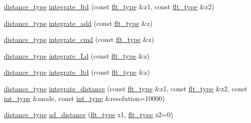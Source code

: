 \begin{DoxyCompactItemize}
\item 
\hyperlink{namespaceIceBRG_a45499647eb87e24c10ab32c628711cec}{distance\-\_\-type} \hyperlink{namespaceIceBRG_ad26acf5308cef1b32f3d1bbe50da3899}{integrate\-\_\-ltd} (const \hyperlink{lib_2IceBRG__main_2common_8h_ad0f130a56eeb944d9ef2692ee881ecc4}{flt\-\_\-type} \&z1, const \hyperlink{lib_2IceBRG__main_2common_8h_ad0f130a56eeb944d9ef2692ee881ecc4}{flt\-\_\-type} \&z2)
\item 
\hyperlink{namespaceIceBRG_a45499647eb87e24c10ab32c628711cec}{distance\-\_\-type} \hyperlink{namespaceIceBRG_a36a9d9b01c4b3decad051fd96a65f255}{integrate\-\_\-add} (const \hyperlink{lib_2IceBRG__main_2common_8h_ad0f130a56eeb944d9ef2692ee881ecc4}{flt\-\_\-type} \&z)
\item 
\hyperlink{namespaceIceBRG_a45499647eb87e24c10ab32c628711cec}{distance\-\_\-type} \hyperlink{namespaceIceBRG_ad2ce8086bbc4c5965a1aa76bd84562b8}{integrate\-\_\-cmd} (const \hyperlink{lib_2IceBRG__main_2common_8h_ad0f130a56eeb944d9ef2692ee881ecc4}{flt\-\_\-type} \&z)
\item 
\hyperlink{namespaceIceBRG_a45499647eb87e24c10ab32c628711cec}{distance\-\_\-type} \hyperlink{namespaceIceBRG_a210041d97246c7869226f8568231abab}{integrate\-\_\-\-Ld} (const \hyperlink{lib_2IceBRG__main_2common_8h_ad0f130a56eeb944d9ef2692ee881ecc4}{flt\-\_\-type} \&z)
\item 
\hyperlink{namespaceIceBRG_a45499647eb87e24c10ab32c628711cec}{distance\-\_\-type} \hyperlink{namespaceIceBRG_a20a04918dd827e062b09cb52a37c5f38}{integrate\-\_\-ltd} (const \hyperlink{lib_2IceBRG__main_2common_8h_ad0f130a56eeb944d9ef2692ee881ecc4}{flt\-\_\-type} \&z)
\item 
\hyperlink{namespaceIceBRG_a45499647eb87e24c10ab32c628711cec}{distance\-\_\-type} \hyperlink{namespaceIceBRG_a9a93961201a81685266c5a6ba22a9a4f}{integrate\-\_\-distance} (const \hyperlink{lib_2IceBRG__main_2common_8h_ad0f130a56eeb944d9ef2692ee881ecc4}{flt\-\_\-type} \&z1, const \hyperlink{lib_2IceBRG__main_2common_8h_ad0f130a56eeb944d9ef2692ee881ecc4}{flt\-\_\-type} \&z2, const \hyperlink{lib_2IceBRG__main_2common_8h_ac4de9d9335536ac22821171deec8d39e}{int\-\_\-type} \&mode, const \hyperlink{lib_2IceBRG__main_2common_8h_ac4de9d9335536ac22821171deec8d39e}{int\-\_\-type} \&resolution=10000)
\item 
\hyperlink{namespaceIceBRG_a45499647eb87e24c10ab32c628711cec}{distance\-\_\-type} \hyperlink{namespaceIceBRG_a6f2a47905657fc5eb2fabd9ff1cf2cb6}{ad\-\_\-distance} (\hyperlink{lib_2IceBRG__main_2common_8h_ad0f130a56eeb944d9ef2692ee881ecc4}{flt\-\_\-type} z1, \hyperlink{lib_2IceBRG__main_2common_8h_ad0f130a56eeb944d9ef2692ee881ecc4}{flt\-\_\-type} z2=0)

\end{DoxyCompactItemize}
